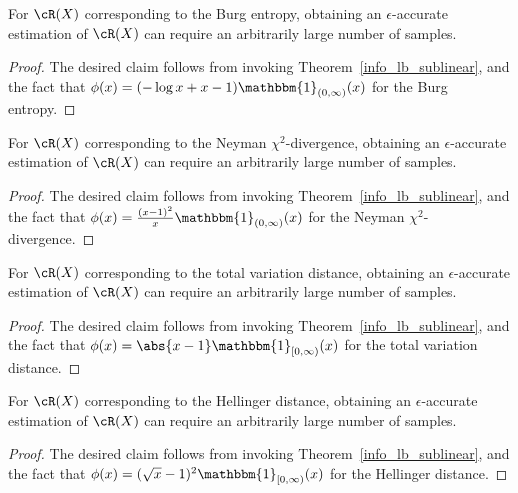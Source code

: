 \documentclass[9pt]{article} %
\numberwithin{equation}{section}
\renewcommand{\frac}[2]{\tfrac{#1}{#2}}
\begin{document}
\begin{corollary}
For $\cR(X)$ corresponding to the Burg entropy, obtaining an $\epsilon$-accurate estimation of $\cR(X)$ can require an arbitrarily large number of samples.
\end{corollary}

\begin{proof}
The desired claim follows from invoking Theorem~\ref{info_lb_sublinear}, and the fact that $\phi(x) = (-\log x + x - 1)\mathbbm{1}_{(0, \infty)}(x)$ for the Burg entropy.
\end{proof}



\begin{corollary}
For $\cR(X)$ corresponding to the Neyman $\chi^2$-divergence, obtaining an $\epsilon$-accurate estimation of $\cR(X)$ can require an arbitrarily large number of samples.
\end{corollary}

\begin{proof}
The desired claim follows from invoking Theorem~\ref{info_lb_sublinear}, and the fact that  
 $\phi(x) = {\frac{(x-1)^2}{x} \mathbbm{1}_{(0, \infty)}(x)}$ for the Neyman $\chi^2$-divergence.
\end{proof}



\begin{corollary}
For $\cR(X)$ corresponding to the total variation distance, obtaining an $\epsilon$-accurate estimation of $\cR(X)$ can require an arbitrarily large number of samples.
\end{corollary}

\begin{proof}
The desired claim follows from invoking Theorem~\ref{info_lb_sublinear}, and the fact that  $\phi(x) = \abs{x-1} \mathbbm{1}_{[0, \infty)}(x)$ for the total
variation distance.
\end{proof}



\begin{corollary}
For $\cR(X)$ corresponding to the Hellinger distance, obtaining an $\epsilon$-accurate estimation of $\cR(X)$ can require an arbitrarily large number of samples.
\end{corollary}

\begin{proof}
The desired claim follows from invoking Theorem~\ref{info_lb_sublinear}, and the fact  that 
 $\phi(x) = (\sqrt{x} - 1)^2 \mathbbm{1}_{[0, \infty)}(x)$ for the Hellinger distance.
\end{proof}
\end{document}

